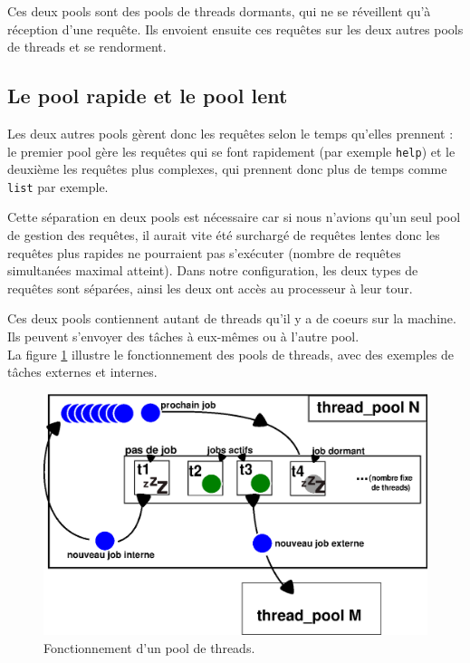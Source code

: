 Ces deux pools sont des pools de threads dormants, qui ne se réveillent qu'à 
réception d'une requête. Ils envoient ensuite ces requêtes sur les deux autres
pools de threads et se rendorment.

\subsection{Le pool rapide et le pool lent}
Les deux autres pools gèrent donc les requêtes selon le temps qu'elles 
prennent : le premier pool gère les requêtes qui se font rapidement 
(par exemple \verb$help$) et le deuxième les requêtes plus complexes, qui 
prennent donc plus de temps comme \verb$list$ par exemple.

Cette séparation en deux pools est nécessaire car si nous n'avions qu'un seul 
pool de gestion des requêtes, il aurait vite été surchargé de requêtes lentes
donc les requêtes plus rapides ne pourraient pas s'exécuter (nombre de requêtes
simultanées maximal atteint). Dans notre configuration, les deux types de 
requêtes sont séparées, ainsi les deux ont accès au processeur à leur tour.

Ces deux pools contiennent autant de threads qu'il y a de coeurs sur la
machine. Ils peuvent s'envoyer des tâches à eux-mêmes ou à l'autre pool.\\

La figure \ref{fonctionnement} illustre le fonctionnement des pools de threads,
 avec des exemples de tâches externes et internes.

\begin{center}
\begin{figure}[htbp]
    \centering
    \includegraphics[scale=0.6]{thread_pool.eps}
    \caption{Fonctionnement d'un pool de threads.}
    \label{fonctionnement}
\end{figure}
\end{center}


